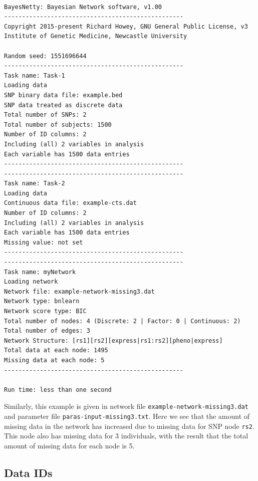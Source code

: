\documentclass[a4paper,12pt]{article}
\newcommand{\code}[1]{{\footnotesize{{\tt #1}}}}
\begin{document}
\vspace{0.35cm} \begin{lstlisting}

BayesNetty: Bayesian Network software, v1.00
--------------------------------------------------
Copyright 2015-present Richard Howey, GNU General Public License, v3
Institute of Genetic Medicine, Newcastle University

Random seed: 1551696644
--------------------------------------------------
Task name: Task-1
Loading data
SNP binary data file: example.bed
SNP data treated as discrete data
Total number of SNPs: 2
Total number of subjects: 1500
Number of ID columns: 2
Including (all) 2 variables in analysis
Each variable has 1500 data entries
--------------------------------------------------
--------------------------------------------------
Task name: Task-2
Loading data
Continuous data file: example-cts.dat
Number of ID columns: 2
Including (all) 2 variables in analysis
Each variable has 1500 data entries
Missing value: not set
--------------------------------------------------
--------------------------------------------------
Task name: myNetwork
Loading network
Network file: example-network-missing3.dat
Network type: bnlearn
Network score type: BIC
Total number of nodes: 4 (Discrete: 2 | Factor: 0 | Continuous: 2)
Total number of edges: 3
Network Structure: [rs1][rs2][express|rs1:rs2][pheno|express]
Total data at each node: 1495
Missing data at each node: 5
--------------------------------------------------

Run time: less than one second

\end{lstlisting} \vspace{0.35cm}
Similarly, this example is given in network file \code{example-network-missing3.dat} and parameter file \code{paras-input-missing3.txt}. Here we see that the amount of missing data in the network has increased due to missing data for SNP node \code{rs2}. This node also has missing data for 3 individuals, with the result that the total amount of missing data for each node is 5. 


\subsection{Data IDs}
\label{input-data-ids}
\end{document}
